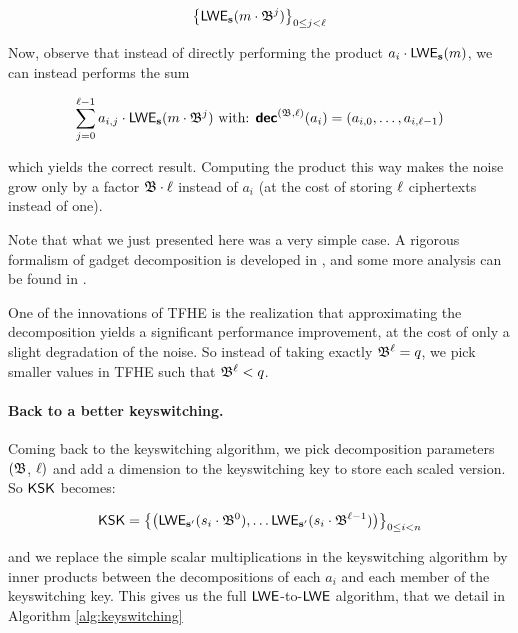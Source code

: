 \[
	\left \lbrace \textsf{LWE}_{\mathbf s}(m \cdot \mathfrak{B}^j) \right \rbrace_{0 \le j < \ell}
\]

Now, observe that instead of directly performing the product $a_i \cdot \textsf{LWE}_{\mathbf s}(m)$, we can instead performs the sum 

\[
	\sum_{j=0}^{\ell - 1} a_{i,j} \cdot \textsf{LWE}_{\mathbf s}(m \cdot \mathfrak{B}^j) \text{ with: } \textbf{\textsf{dec}}^{(\mathfrak{B}, \ell)}(a_i) = (a_{i, 0}, \dots, a_{i, \ell-1})
\]

which yields the correct result. Computing the product this way makes the noise grow only by a factor $\mathfrak{B} \cdot \ell$ instead of $a_i$ (at the cost of storing $\ell$ ciphertexts instead of one).



Note that what we just presented here was a very simple case. A rigorous formalism of gadget decomposition is developed in \cite{EC:GenMicPol19}, and some more analysis can be found in \cite{AC:Joye21}.


One of the innovations of TFHE is the realization that approximating the decomposition yields a significant performance improvement, at the cost of only a slight degradation of the noise. So instead of taking exactly $\mathfrak{B}^\ell = q$, we pick smaller values in TFHE such that $\mathfrak{B}^\ell < q$.


\paragraph{Back to a better keyswitching.}

Coming back to the keyswitching algorithm, we pick decomposition parameters $(\mathfrak{B}$, $\ell)$ and add a dimension to the keyswitching key to store each scaled version. So $\textsf{KSK}$ becomes:

\[
	\textsf{KSK} = \left \lbrace \left ( \textsf{LWE}_{\mathbf s'} (s_i \cdot \mathfrak{B}^0), \dots  \textsf{LWE}_{\mathbf s'} (s_i \cdot \mathfrak{B}^{\ell-1}) \right ) \right \rbrace_{0 \le i < n}
\]


and we replace the simple scalar multiplications in the keyswitching algorithm by inner products between the decompositions of each $a_i$ and each member of the keyswitching key. This gives us the full $\textsf{LWE}$-to-$\textsf{LWE}$ algorithm, that we detail in Algorithm \ref{alg:keyswitching}








